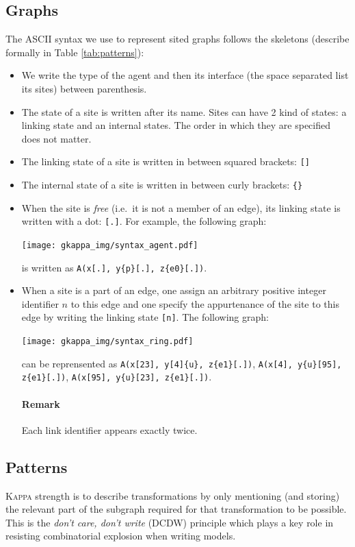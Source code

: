 \documentclass[11pt]{book}
\def\Kappa{\textsc{Kappa}}
\def\ttt#1{\texttt{#1}}
\def\ie{i.e.~}
\newcommand{\Remark}{\paragraph{Remark}}
\begin{document}
\subsection{Graphs}
The ASCII syntax we use to represent sited graphs follows the
skeletons (describe formally in Table \ref{tab:patterns}):
\begin{itemize}
\item We write the type of the agent and then its interface (the space
  separated list its sites) between parenthesis.
\item The state of a site is written after its name. Sites can have 2
  kind of states: a linking state and an internal states. The order in
  which they are specified does not matter.
\item The linking state of a site is written in between squared
  brackets: \ttt{[]}
\item The internal state of a site is written in between curly
  brackets: \ttt{\{\}}
\item When the site is \emph{free} ({\ie}it is not a member of an
  edge), its linking state is written with a dot: \ttt{[.]}. For example,
  the following graph:
  \begin{center}
    \texttt{[image: gkappa\_img/syntax\_agent.pdf]}
  \end{center}
  is written as \ttt{A(x[.], y\{p\}[.], z\{e0\}[.])}.
\item When a site is a part of an edge, one assign an arbitrary
  positive integer identifier $n$ to this edge and one specify the
  appurtenance of the site to this edge by writing the linking state
  \ttt{[n]}. The following graph:
  \begin{center}
    \texttt{[image: gkappa\_img/syntax\_ring.pdf]}
  \end{center}
  can be reprensented as \ttt{A(x[23], y[4]\{u\}, z\{e1\}[.])},
  \ttt{A(x[4], y\{u\}[95], z\{e1\}[.])},
  \ttt{A(x[95], y\{u\}[23], z\{e1\}[.])}.

  \Remark{Each link identifier appears exactly twice.}
\end{itemize}

\subsection{Patterns}
\Kappa{} strength is to describe transformations by only mentioning (and
storing) the relevant part of the subgraph required for that
transformation to be possible. This is the \emph{don't care, don't
  write} (DCDW) principle which plays a
key role in resisting combinatorial explosion when writing models.
\end{document}
